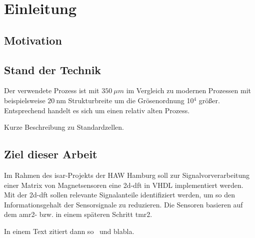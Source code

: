 \chapter{Einleitung}
 \section{Motivation}

\section{Stand der Technik}
Der verwendete Prozess ist mit $\SI{350}{\mu m}$ im Vergleich zu modernen Prozessen mit beispielsweise $\SI{20}{\nm}$ Strukturbreite um die Grösenordnung 10$^4$ größer. Entsprechend handelt es 
sich um einen relativ alten Prozess.

Kurze Beschreibung zu Standardzellen.


\section{Ziel dieser Arbeit}
Im Rahmen des \gls{isar}-Projekts der HAW Hamburg soll zur Signalvorverarbeitung einer Matrix von Magnetsensoren  eine \gls{2d-dft} in VHDL implementiert werden. Mit der 
\gls{2d-dft} sollen relevante Signalanteile identifiziert werden, um so den Informationsgehalt der Sensorsignale zu reduzieren. Die Sensoren basieren auf dem \gls{amr2}- 
bzw. in einem späteren Schritt \gls{tmr2}.

In einem Text zitiert dann so~\autocite[10-20]{krey2015systemarchitektur} und blabla.

